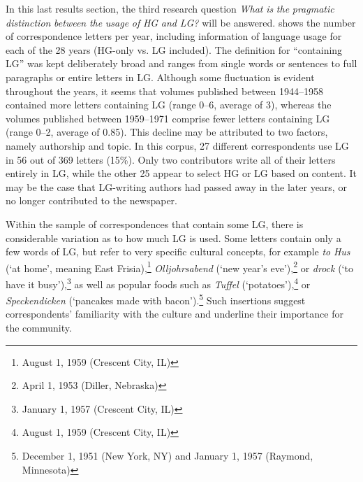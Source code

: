\documentclass[output=paper]{langsci/langscibook}
\begin{document}
 
In this last results section, the third research question \textit{What} \textit{is} \textit{the} \textit{pragmatic} \textit{distinction} \textit{between} \textit{the} \textit{usage} \textit{of} \textit{HG} \textit{and} \textit{LG?} will be answered.  shows the number of correspondence letters per year, including information of language usage for each of the 28 years (HG-only vs. LG included). The definition for “containing LG” was kept deliberately broad and ranges from single words or sentences to full paragraphs or entire letters in LG. Although some fluctuation is evident throughout the years, it seems that volumes published between 1944--1958 contained more letters containing LG (range 0--6, average of 3), whereas the volumes published between 1959--1971 comprise fewer letters containing LG (range 0--2, average of 0.85). This decline may be attributed to two factors, namely authorship and topic. In this corpus, 27 different correspondents use LG in 56 out of 369 letters (15\%). Only two contributors write all of their letters entirely in LG, while the other 25 appear to select HG or LG based on content. It may be the case that LG-writing authors had passed away in the later years, or no longer contributed to the newspaper. 
 
Within the sample of correspondences that contain some LG, there is considerable variation as to how much LG is used. Some letters contain only a few words of LG, but refer to very specific cultural concepts, for example \textit{to} \textit{Hus} (‘at home’, meaning East Frisia),\footnote{August 1, 1959 (Crescent City, IL)} \textit{Olljohrsabend} (‘new year’s eve’),\footnote{April 1, 1953 (Diller, Nebraska)} or \textit{drock} (‘to have it busy’),\footnote{January 1, 1957 (Crescent City, IL)} as well as popular foods such as \textit{Tuffel} (‘potatoes’),\footnote{August 1, 1959 (Crescent City, IL)} or \textit{Speckendicken} (‘pancakes made with bacon’).\footnote{December 1, 1951 (New York, NY) and January 1, 1957 (Raymond, Minnesota)} Such insertions suggest correspondents’ familiarity with the culture and underline their importance for the community. 
\end{document}

